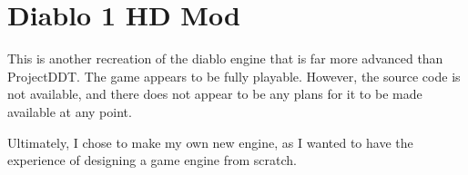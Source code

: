     	\section{Diablo 1 HD Mod}
    	This\cite{d1hd} is another recreation of the diablo engine that is far more advanced than ProjectDDT. The game appears to be fully playable. However, the source code is not available, and there does not appear to be any plans for it to be made available at any point.

\mbox{}

\noindent
Ultimately, I chose to make my own new engine, as I wanted to have the experience of designing a game engine from scratch.